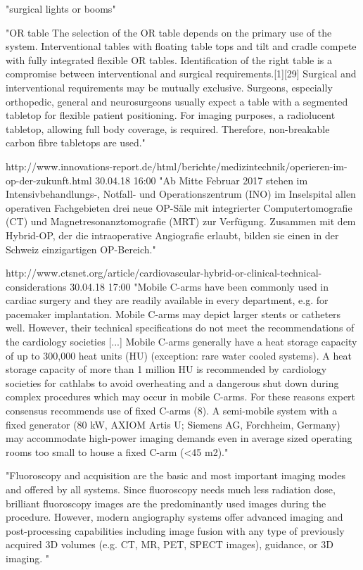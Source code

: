 	"surgical lights or booms"
	
	"OR table
	The selection of the OR table depends on the primary use of the system. Interventional tables with floating table tops and tilt and cradle compete with fully integrated flexible OR tables. Identification of the right table is a compromise between interventional and surgical requirements.[1][29] Surgical and interventional requirements may be mutually exclusive. Surgeons, especially orthopedic, general and neurosurgeons usually expect a table with a segmented tabletop for flexible patient positioning. For imaging purposes, a radiolucent tabletop, allowing full body coverage, is required. Therefore, non-breakable carbon fibre tabletops are used."
	
http://www.innovations-report.de/html/berichte/medizintechnik/operieren-im-op-der-zukunft.html 30.04.18 16:00	
	"Ab Mitte Februar 2017 stehen im Intensivbehandlungs-, Notfall- und Operationszentrum (INO) im Inselspital allen operativen Fachgebieten drei neue OP-Säle mit integrierter Computertomografie (CT) und Magnetresonanztomografie (MRT) zur Verfügung. Zusammen mit dem Hybrid-OP, der die intraoperative Angiografie erlaubt, bilden sie einen in der Schweiz einzigartigen OP-Bereich."

http://www.ctsnet.org/article/cardiovascular-hybrid-or-clinical-technical-considerations 30.04.18 17:00	
	"Mobile C-arms have been commonly used in cardiac surgery and they are readily available in every department, e.g. for pacemaker implantation. Mobile C-arms may depict larger stents or catheters well. However, their technical specifications do not meet the recommendations of the cardiology societies [...] 
	Mobile C-arms generally have a heat storage capacity of up to 300,000 heat units (HU) (exception: rare water cooled systems). A heat storage capacity of more than 1 million HU is recommended by cardiology societies for cathlabs to avoid overheating and a dangerous shut down during complex procedures which may occur in mobile C-arms. For these reasons expert consensus recommends use of fixed C-arms (8). A semi-mobile system with a fixed generator (80 kW, AXIOM Artis U; Siemens AG, Forchheim, Germany) may accommodate high-power imaging demands even in average sized operating rooms too small to house a fixed C-arm (<45 m2)."
	
	"Fluoroscopy and acquisition are the basic and most important imaging modes and offered by all systems. Since fluoroscopy needs much less radiation dose, brilliant fluoroscopy images are the predominantly used images during the procedure. However, modern angiography systems offer advanced imaging and post-processing capabilities including image fusion with any type of previously acquired 3D volumes (e.g. CT, MR, PET, SPECT images), guidance, or 3D imaging.  "
	
